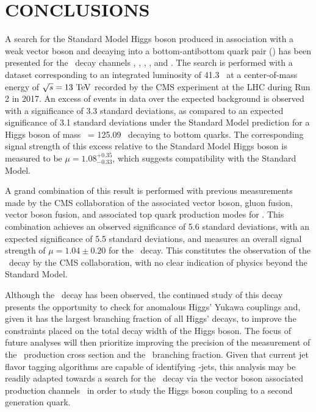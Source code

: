 \chapter{CONCLUSIONS} \label{conclusions}

A search for the Standard Model Higgs boson produced in association with a weak vector boson and decaying into a bottom-antibottom quark pair (\bb) has been presented for the \VHbb\ decay channels \ZnnHbb, \WenHbb, \WmnHbb, \ZeeHbb, and \ZmmHbb. The search is performed with a dataset corresponding to an integrated luminosity of 41.3 \invfb\ at a center-of-mass energy of $\sqrt{s} = 13\ \mathrm{TeV}$ recorded by the CMS experiment at the LHC during Run 2 in 2017. An excess of events in data over the expected background is observed with a significance of 3.3 standard deviations, as compared to an expected significance of 3.1 standard deviations under the Standard Model prediction for a Higgs boson of mass \massH\ = 125.09 \GeV\ decaying to bottom quarks. The corresponding signal strength of this excess relative to the Standard Model Higgs boson is measured to be $\mu = 1.08_{-0.33}^{+0.35}$, which suggests compatibility with the Standard Model.

A grand combination of this result is performed with previous measurements made by the CMS collaboration of the associated vector boson, gluon fusion, vector boson fusion, and associated top quark production modes for \Htobb. This combination achieves an observed significance of 5.6 standard deviations, with an expected significance of 5.5 standard deviations, and measures an overall signal strength of $\mu = 1.04 \pm 0.20$ for the \Htobb\ decay. This constitutes the observation of the \Htobb\ decay by the CMS collaboration, with no clear indication of physics beyond the Standard Model.

Although the \Htobb\ decay has been observed, the continued study of this decay presents the opportunity to check for anomalous Higgs' Yukawa couplings and, given it has the largest branching fraction of all Higgs' decays, to improve the constraints placed on the total decay width of the Higgs boson. The focus of future analyses will then prioritize improving the precision of the measurement of the \VHbb\ production cross section and the \Htobb\ branching fraction. Given that current jet flavor tagging algorithms are capable of identifying \qrkc-jets, this analysis may be readily adapted towards a search for the \Htocc\ decay via the vector boson associated production channels \VHcc\ in order to study the Higgs boson coupling to a second generation quark. 

